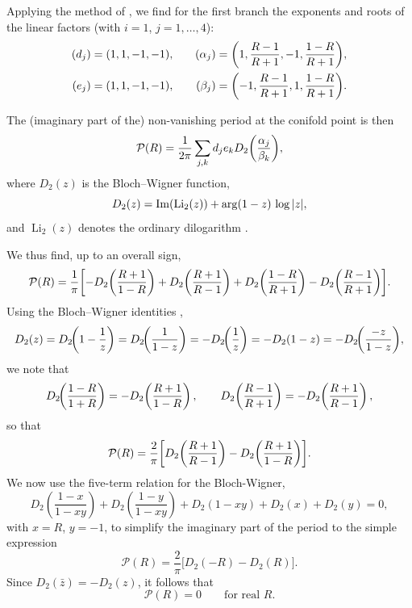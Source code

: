 \documentclass[11pt, a4paper]{article}
\numberwithin{equation}{section}
\begin{document}
Applying the method of \cite[Section~4.2]{kerr2008}, we find for the first branch the exponents and roots of the linear factors (with $i=1$, $j = 1,\dots,4$):
\begin{equation}
  \begin{aligned}
    (d_j) &= (1, 1, -1, -1), &\quad (\alpha_j) = \qty(1,\frac{R-1}{R+1},-1,\frac{1-R}{R+1}), \\
    (e_j) &= (1, 1, -1, -1), &\quad (\beta_j) = \qty(-1,\frac{R-1}{R+1},1,\frac{1-R}{R+1}).
  \end{aligned}
\end{equation}

The (imaginary part of the) non-vanishing period at the conifold point is then
\begin{equation}
  \mathcal{P}(R) = \frac{1}{2\pi} \sum_{j, k} d_j e_k D_2\qty(\frac{\alpha_j}{\beta_k}),
\end{equation}
where $D_2(z)$ is the Bloch--Wigner function,
\begin{equation}
  D_2(z) = \Im\!\qty(\operatorname{Li}_2(z)) + \arg(1-z)\,\log\abs{z},
\end{equation}
and $\operatorname{Li}_2(z)$ denotes the ordinary dilogarithm \cite{zagier:dilogarithm}.

We thus find, up to an overall sign,
\begin{equation}
  \mathcal{P}(R) = \frac{1}{\pi} \qty[-D_2\!\left(\frac{R+1}{1-R}\right)
  + D_2\!\left(\frac{R+1}{R-1}\right)
  + D_2\!\left(\frac{1-R}{R+1}\right)
  - D_2\!\left(\frac{R-1}{R+1}\right)].
\end{equation}
Using the Bloch--Wigner identities \cite[Eq.~(3)]{zagier:dilogarithm},
\begin{equation}
  D_2(z) = D_2\!\qty(1-\frac{1}{z}) = D_2\!\qty(\frac{1}{1-z})
  = -D_2\!\qty(\frac{1}{z}) = -D_2(1-z)
  = -D_2\!\qty(\frac{-z}{1-z}),
\end{equation}
we note that
\begin{equation}
  D_2\!\qty(\frac{1-R}{1+R}) = -D_2\!\left(\frac{R+1}{1-R}\right),
  \qquad
  D_2\!\left(\frac{R-1}{R+1}\right) = -D_2\!\left(\frac{R+1}{R-1}\right),
\end{equation}
so that
\begin{equation}\label{eqn:realPeriod}
  \mathcal{P}(R) = \frac{2}{\pi}
  \qty[D_2\!\left(\frac{R+1}{R-1}\right)
  - D_2\!\left(\frac{R+1}{1-R}\right)].
\end{equation}
We now use the five-term relation for the Bloch-Wigner,
\begin{equation}
  D_2\left(\frac{1-x}{1-x y}\right)+D_2\left(\frac{1-y}{1-x y}\right)+D_2(1-x y)+D_2(x)+D_2(y) = 0,
\end{equation}
with $x = R$, $y = -1$, to simplify the imaginary part of the period to the simple expression
\begin{equation}
  \mathcal{P}(R) = \frac{2}{\pi } \bigl[D_2(-R)-D_2(R)\bigr].
\end{equation}
Since $D_2(\bar{z}) = -D_2(z)$, it follows that
\begin{equation}
  \mathcal{P}(R) = 0 \qquad \text{for real } R.
\end{equation}
\end{document}
